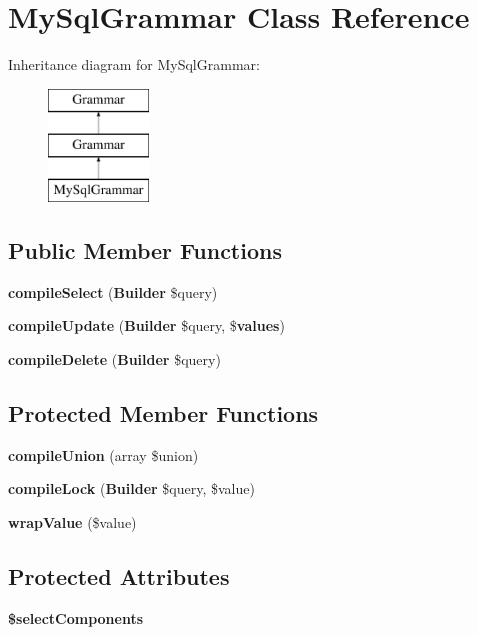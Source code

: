 \section{My\+Sql\+Grammar Class Reference}
\label{class_illuminate_1_1_database_1_1_query_1_1_grammars_1_1_my_sql_grammar}
Inheritance diagram for My\+Sql\+Grammar\+:\begin{figure}[H]
\begin{center}
\leavevmode
\includegraphics[height=3.000000cm]{class_illuminate_1_1_database_1_1_query_1_1_grammars_1_1_my_sql_grammar}
\end{center}
\end{figure}
\subsection*{Public Member Functions}
\begin{DoxyCompactItemize}
\item 
{\bf compile\+Select} ({\bf Builder} \$query)
\item 
{\bf compile\+Update} ({\bf Builder} \$query, \${\bf values})
\item 
{\bf compile\+Delete} ({\bf Builder} \$query)
\end{DoxyCompactItemize}
\subsection*{Protected Member Functions}
\begin{DoxyCompactItemize}
\item 
{\bf compile\+Union} (array \$union)
\item 
{\bf compile\+Lock} ({\bf Builder} \$query, \$value)
\item 
{\bf wrap\+Value} (\$value)
\end{DoxyCompactItemize}
\subsection*{Protected Attributes}
\begin{DoxyCompactItemize}
\item 
{\bf \$select\+Components}
\end{DoxyCompactItemize}


